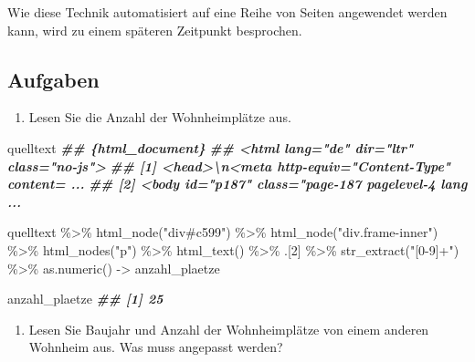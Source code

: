 \documentclass[
  ngerman,
]{article}
\newenvironment{Shaded}{\begin{snugshade}}{\end{snugshade}}
\newcommand{\DecValTok}[1]{\textcolor[rgb]{0.00,0.00,0.81}{#1}}
\newcommand{\DocumentationTok}[1]{\textcolor[rgb]{0.56,0.35,0.01}{\textbf{\textit{#1}}}}
\newcommand{\FunctionTok}[1]{\textcolor[rgb]{0.00,0.00,0.00}{#1}}
\newcommand{\NormalTok}[1]{#1}
\newcommand{\OtherTok}[1]{\textcolor[rgb]{0.56,0.35,0.01}{#1}}
\newcommand{\SpecialCharTok}[1]{\textcolor[rgb]{0.00,0.00,0.00}{#1}}
\newcommand{\StringTok}[1]{\textcolor[rgb]{0.31,0.60,0.02}{#1}}
\providecommand{\tightlist}{%
  \setlength{\itemsep}{0pt}\setlength{\parskip}{0pt}}
\begin{document}
Wie diese Technik automatisiert auf eine Reihe von Seiten angewendet werden kann, wird zu einem späteren Zeitpunkt besprochen.

\hypertarget{aufgaben-6}{%
\subsection{Aufgaben}\label{aufgaben-6}}

\begin{enumerate}
\def\labelenumi{\arabic{enumi}.}
\tightlist
\item
  Lesen Sie die Anzahl der Wohnheimplätze aus.
\end{enumerate}

\begin{Shaded}
\begin{Highlighting}[]
\NormalTok{quelltext}
\DocumentationTok{\#\# \{html\_document\}}
\DocumentationTok{\#\# \textless{}html lang="de" dir="ltr" class="no{-}js"\textgreater{}}
\DocumentationTok{\#\# [1] \textless{}head\textgreater{}\textbackslash{}n\textless{}meta http{-}equiv="Content{-}Type" content= ...}
\DocumentationTok{\#\# [2] \textless{}body id="p187" class="page{-}187 pagelevel{-}4 lang ...}
\end{Highlighting}
\end{Shaded}

\begin{Shaded}
\begin{Highlighting}[]
\NormalTok{quelltext }\SpecialCharTok{\%\textgreater{}\%}
  \FunctionTok{html\_node}\NormalTok{(}\StringTok{"div\#c599"}\NormalTok{) }\SpecialCharTok{\%\textgreater{}\%}
  \FunctionTok{html\_node}\NormalTok{(}\StringTok{"div.frame{-}inner"}\NormalTok{) }\SpecialCharTok{\%\textgreater{}\%}
  \FunctionTok{html\_nodes}\NormalTok{(}\StringTok{"p"}\NormalTok{) }\SpecialCharTok{\%\textgreater{}\%}
  \FunctionTok{html\_text}\NormalTok{() }\SpecialCharTok{\%\textgreater{}\%}
\NormalTok{  .[}\DecValTok{2}\NormalTok{] }\SpecialCharTok{\%\textgreater{}\%}
  \FunctionTok{str\_extract}\NormalTok{(}\StringTok{"[0{-}9]+"}\NormalTok{) }\SpecialCharTok{\%\textgreater{}\%}
  \FunctionTok{as.numeric}\NormalTok{() }\OtherTok{{-}\textgreater{}}\NormalTok{ anzahl\_plaetze}

\NormalTok{anzahl\_plaetze}
\DocumentationTok{\#\# [1] 25}
\end{Highlighting}
\end{Shaded}

\begin{enumerate}
\def\labelenumi{\arabic{enumi}.}
\setcounter{enumi}{1}
\tightlist
\item
  Lesen Sie Baujahr und Anzahl der Wohnheimplätze von einem anderen Wohnheim aus. Was muss angepasst werden?
\end{enumerate}
\end{document}
